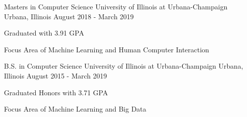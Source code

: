 

\begin{cventries}

  \cventry
    {Masters in Computer Science} %
    {University of Illinois at Urbana-Champaign} %
    {Urbana, Illinois} %
    {August 2018 - March 2019} %
    {
      \begin{cvitems} %
        \item {Graduated with 3.91 GPA}
        \item {Focus Area of Machine Learning and Human Computer Interaction}
      \end{cvitems}
    }
    
\cventry
    {B.S. in Computer Science} %
    {University of Illinois at Urbana-Champaign} %
    {Urbana, Illinois} %
    {August 2015 - March 2019} %
    {
      \begin{cvitems} %
        \item {Graduated Honors with 3.71 GPA}
        \item {Focus Area of Machine Learning and Big Data}
      \end{cvitems}
    }


\end{cventries}
